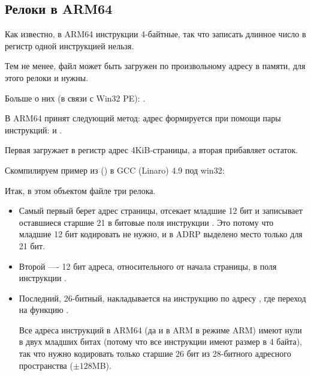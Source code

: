﻿\newcommand{\ARMELF}{\InSqBrackets{\emph{ELF for the ARM 64-bit Architecture (AArch64)}, (2013)}\footnote{\AlsoAvailableAs \url{http://infocenter.arm.com/help/topic/com.arm.doc.ihi0056b/IHI0056B_aaelf64.pdf}}}

\subsection{Релоки в ARM64}
\label{ARM64_relocs}

Как известно, в ARM64 инструкции 4-байтные, так что записать длинное число в регистр одной инструкцией нельзя.

Тем не менее, файл может быть загружен по произвольному адресу в памяти, для этого релоки и нужны.

Больше о них (в связи с Win32 PE): .

В ARM64 принят следующий метод: адрес формируется при помощи пары инструкций:  и \ADD.

Первая загружает в регистр адрес 4KiB-страницы, а вторая прибавляет остаток.

Скомпилируем пример из \q{\HelloWorldSectionName} 
() в GCC (Linaro) 4.9 под win32:



Итак, в этом объектом файле три релока.

\begin{itemize}
\item 
Самый первый берет адрес страницы, отсекает младшие 12 бит и записывает оставшиеся старшие 21
в битовые поля инструкции . Это потому что младшие 12 бит кодировать не нужно,
и в ADRP выделено место только для 21 бит.

\item Второй ---- 12 бит адреса, относительного от начала страницы, в поля инструкции \ADD.

\item Последний, 26-битный, накладывается на инструкцию по адресу , где переход на функцию \printf.

Все адреса инструкций в ARM64 (да и в ARM в режиме ARM) имеют нули в двух младших битах
(потому что все инструкции имеют размер в 4 байта),
так что нужно кодировать только старшие 26 бит из 28-битного адресного пространства ($\pm 128$MB).

\end{itemize}

